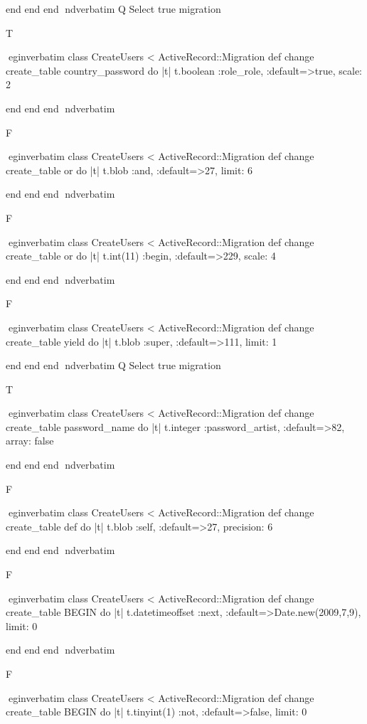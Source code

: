     end 
  end 
end
nd{verbatim}
Q
 Select true migration

T

egin{verbatim}
 class CreateUsers < ActiveRecord::Migration 
  def change 
    create_table country_password do |t| 
      t.boolean :role_role, :default=>true, scale: 2
    
    end 
  end 
end
nd{verbatim}

F

egin{verbatim}
 class CreateUsers < ActiveRecord::Migration 
  def change 
    create_table or do |t| 
      t.blob :and, :default=>27, limit: 6
    
    end 
  end 
end
nd{verbatim}

F

egin{verbatim}
 class CreateUsers < ActiveRecord::Migration 
  def change 
    create_table or do |t| 
      t.int(11) :begin, :default=>229, scale: 4
    
    end 
  end 
end
nd{verbatim}

F

egin{verbatim}
 class CreateUsers < ActiveRecord::Migration 
  def change 
    create_table yield do |t| 
      t.blob :super, :default=>111, limit: 1
    
    end 
  end 
end
nd{verbatim}
Q
 Select true migration

T

egin{verbatim}
 class CreateUsers < ActiveRecord::Migration 
  def change 
    create_table password_name do |t| 
      t.integer :password_artist, :default=>82, array: false
    
    end 
  end 
end
nd{verbatim}

F

egin{verbatim}
 class CreateUsers < ActiveRecord::Migration 
  def change 
    create_table def do |t| 
      t.blob :self, :default=>27, precision: 6
    
    end 
  end 
end
nd{verbatim}

F

egin{verbatim}
 class CreateUsers < ActiveRecord::Migration 
  def change 
    create_table BEGIN do |t| 
      t.datetimeoffset :next, :default=>Date.new(2009,7,9), limit: 0
    
    end 
  end 
end
nd{verbatim}

F

egin{verbatim}
 class CreateUsers < ActiveRecord::Migration 
  def change 
    create_table BEGIN do |t| 
      t.tinyint(1) :not, :default=>false, limit: 0
    
